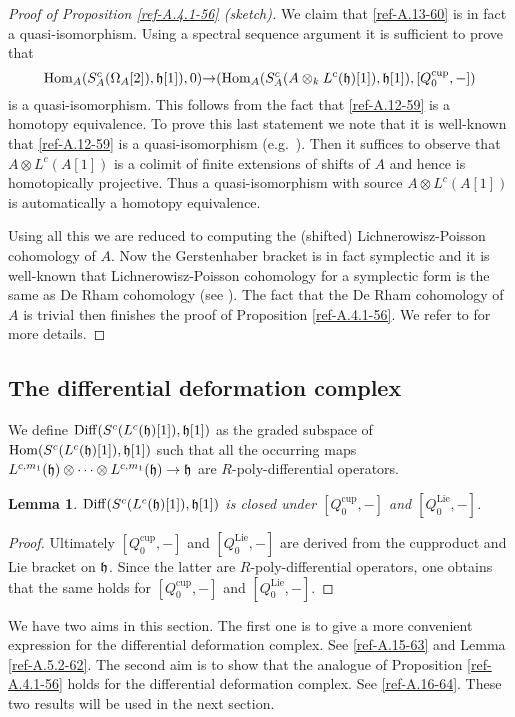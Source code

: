\documentclass{amsart}
\numberwithin{equation}{section}
\newtheorem{lemmas}{Lemma}[subsection]
\theoremstyle{definition}
\theoremstyle{remark}
\begin{document}
\begin{proof}[Proof of Proposition \ref{ref-A.4.1-56} (sketch)]
We claim that \eqref{ref-A.13-60} is in fact a quasi-isomorphism. Using a spectral
sequence argument it is sufficient to prove that 
\[
{\operatorname {Hom}}_A(S^c_A(\Omega_A[2]),\frak{h}[1]),0)
{\rightarrow}
({\operatorname {Hom}}_A(S^c_A(A\otimes_k L^c(\frak{h})[1]),\frak{h}[1]),[Q_0^{\operatorname{cup}},-])
\]
is a quasi-isomorphism. This follows from the fact that
\eqref{ref-A.12-59} is a homotopy equivalence. To prove this last statement
we note that it is well-known that \eqref{ref-A.12-59} is a quasi-isomorphism
(e.g.\ \cite[Lemma 2.5.10]{Kapra}). Then it suffices to observe that
$A\otimes L^c(A[1])$ is a colimit of finite extensions of shifts of $A$
and hence is homotopically projective. Thus a quasi-isomorphism 
with source $A\otimes L^c(A[1])$ is automatically a homotopy equivalence. 

Using all this we are reduced to computing the (shifted) Lichnerowisz-Poisson
cohomology of $A$. Now the Gerstenhaber bracket is in fact symplectic
and it is well-known that Lichnerowisz-Poisson cohomology for a symplectic form is the
same as De Rham cohomology (see \cite{Bryl}). The fact that
the De Rham cohomology of $A$ is trivial then finishes the proof of 
Proposition \ref{ref-A.4.1-56}. We refer to \cite{Tamarkin} for more
details.
\end{proof}

\subsection{The differential deformation complex}

We define ${\operatorname{Diff}}(S^c(L^{c}(\frak{h})[1]),\frak{h}[1])$ as the graded subspace
of ${\operatorname {Hom}}(S^c(L^{c}(\frak{h})[1]),\frak{h}[1])$ such
that all the occurring maps $L^{c,m_1}(\frak{h})\otimes \cdots \otimes
L^{c,m_1}(\frak{h})\rightarrow \frak{h}$ are $R$-poly-differential operators.
\begin{lemmas}
${\operatorname{Diff}}(S^c(L^{c}(\frak{h})[1]),\frak{h}[1])$ is closed under $[Q_0^{\operatorname{cup}},-]$
and $[Q_0^{\operatorname{Lie}},-]$.
\end{lemmas}
\begin{proof} Ultimately $[Q_0^{\operatorname{cup}},-]$ and $[Q_0^{\operatorname{Lie}},-]$ are derived
from the cupproduct and Lie bracket on $\frak{h}$. Since the latter
are $R$-poly-differential operators, one obtains that the same holds
for $[Q_0^{\operatorname{cup}},-]$ and $[Q_0^{\operatorname{Lie}},-]$.
\end{proof}
We have two aims in this section. The first one is to give a more
convenient expression for the differential deformation complex. See
\eqref{ref-A.15-63} and Lemma \ref{ref-A.5.2-62}.
The second aim is to show that the analogue of 
Proposition \ref{ref-A.4.1-56} holds for the differential deformation
complex. See \eqref{ref-A.16-64}.  These two results will be used
in the next section. 
\end{document}
